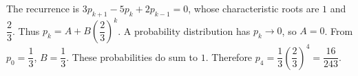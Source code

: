 The recurrence is $3p_{k+1}-5p_k+2p_{k-1}=0$, whose characteristic roots are $1$ and $\dfrac{2}{3}$. Thus $p_k=A+B(\dfrac{2}{3})^k$. A probability distribution has $p_k\to0$, so $A=0$. From $p_0=\dfrac{1}{3}$, $B=\dfrac{1}{3}$. These probabilities do sum to $1$. Therefore $p_4=\dfrac{1}{3}(\dfrac{2}{3})^4=\boxed{\dfrac{16}{243}}$.
